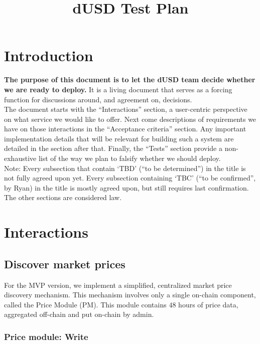 \documentclass{article} %
\title{dUSD Test Plan}
\begin{document}
\maketitle

\section{Introduction}

\textbf{The purpose of this document is to let the dUSD team decide whether we are ready to deploy.}
It is a living document that serves as a forcing function for discussions
around, and agreement on, decisions. \\

The document starts with the ``Interactions'' section, a user-centric
perspective on what service we would like to offer.
Next come descriptions of requirements we have on those interactions in the
``Acceptance criteria'' section.
Any important implementation details that will be relevant for building such a
system are detailed in the section after that.
Finally, the ``Tests'' section provide a non-exhaustive list of the way we plan
to falsify whether we should deploy. \\

Note: Every subsection that contain `TBD' (``to be determined'') in the title is
not fully agreed upon yet.
Every subsection containing `TBC' (``to be confirmed'', by Ryan) in the title is
mostly agreed upon, but still requires last confirmation.
The other sections are considered law.

\section{Interactions}

\subsection{Discover market prices}

For the MVP version, we implement a simplified, centralized market price
discovery mechanism.
This mechanism involves only a single on-chain component, called the Price
Module (PM).
This module contains $48$ hours of price data, aggregated off-chain and put
on-chain by admin.

\subsubsection{Price module: Write}
\end{document}
